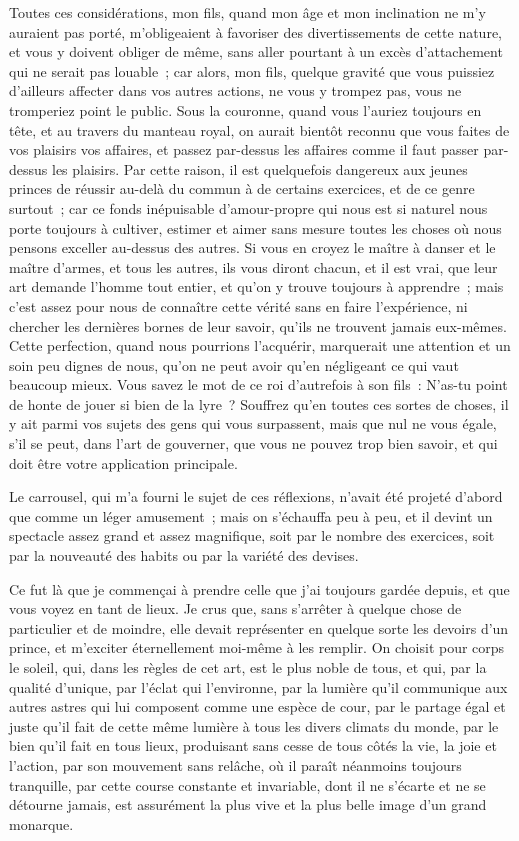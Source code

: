 \documentclass[french,twoside]{book} %
\begin{document}
Toutes ces considérations, mon fils, quand mon âge et mon inclination ne m’y auraient pas porté, m’obligeaient à favoriser des divertissements de cette nature, et vous y doivent obliger de même, sans aller pourtant à un excès d’attachement qui ne serait pas louable ; car alors, mon fils, quelque gravité que vous puissiez d’ailleurs affecter dans vos autres actions, ne vous y trompez pas, vous ne tromperiez point le public. Sous la couronne, quand vous l’auriez toujours en tête, et au travers du manteau royal, on aurait bientôt reconnu que vous faites de vos plaisirs vos affaires, et passez par-dessus les affaires comme il faut passer par-dessus les plaisirs. Par cette raison, il est quelquefois dangereux aux jeunes princes de réussir au-delà du commun à de certains exercices, et de ce genre surtout ; car ce fonds inépuisable d’amour-propre qui nous est si naturel nous porte toujours à cultiver, estimer et aimer sans mesure toutes les choses où nous pensons exceller au-dessus des autres. Si vous en croyez le maître à danser et le maître d’armes, et tous les autres, ils vous diront chacun, et il est vrai, que leur art demande l’homme tout entier, et qu’on y trouve toujours à apprendre ; mais c’est assez pour nous de connaître cette vérité sans en faire l’expérience, ni chercher les dernières bornes de leur savoir, qu’ils ne trouvent jamais eux-mêmes. Cette perfection, quand nous pourrions l’acquérir, marquerait une attention et un soin peu dignes de nous, qu’on ne peut avoir qu’en négligeant ce qui vaut beaucoup mieux. Vous savez le mot de ce roi d’autrefois à son fils : N’as-tu point de honte de jouer si bien de la lyre ? Souffrez qu’en toutes ces sortes de choses, il y ait parmi vos sujets des gens qui vous surpassent, mais que nul ne vous égale, s’il se peut, dans l’art de gouverner, que vous ne pouvez trop bien savoir, et qui doit être votre application principale.\par
Le carrousel, qui m’a fourni le sujet de ces réflexions, n’avait été projeté d’abord que comme un léger amusement ; mais on s’échauffa peu à peu, et il devint un spectacle assez grand et assez magnifique, soit par le nombre des exercices, soit par la nouveauté des habits ou par la variété des devises.\par
Ce fut là que je commençai à prendre celle que j’ai toujours gardée depuis, et que vous voyez en tant de lieux. Je crus que, sans s’arrêter à quelque chose de particulier et de moindre, elle devait représenter en quelque sorte les devoirs d’un prince, et m’exciter éternellement moi-même à les remplir. On choisit pour corps le soleil, qui, dans les règles de cet art, est le plus noble de tous, et qui, par la qualité d’unique, par l’éclat qui l’environne, par la lumière qu’il communique aux autres astres qui lui composent comme une espèce de cour, par le partage égal et juste qu’il fait de cette même lumière à tous les divers climats du monde, par le bien qu’il fait en tous lieux, produisant sans cesse de tous côtés la vie, la joie et l’action, par son mouvement sans relâche, où il paraît néanmoins toujours tranquille, par cette course constante et invariable, dont il ne s’écarte et ne se détourne jamais, est assurément la plus vive et la plus belle image d’un grand monarque.\par
\end{document}
